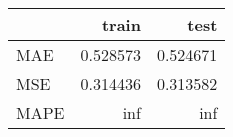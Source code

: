\begin{tabular}{lrr}
\toprule
{} &     train &      test \\
\midrule
MAE  &  0.528573 &  0.524671 \\
MSE  &  0.314436 &  0.313582 \\
MAPE &       inf &       inf \\
\bottomrule
\end{tabular}

